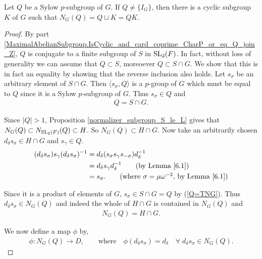 \begin{theorem}
  \label{MaximalAbelianSubgroup.exists_IsCyclic_K_normalizer_eq_Q_join_K}
  Let $Q$ be a Sylow $p$-subgroup of $G$. If $Q \neq \{I_G\}$, then there is a cyclic subgroup $K$ of $G$ such that $N_G(Q) = Q \sqcup K = QK$. \\
\end{theorem}
\begin{proof}
By part \ref{MaximalAbelianSubgroup.IsCyclic_and_card_coprime_CharP_or_eq_Q_join_Z}, $Q$ is conjugate to a finite subgroup of $S$ in $\operatorname{SL}_2(F)$. In fact, without loss of generality we can assume that $Q \subset S$, moreoever $Q \subset S \cap G$. We show that this is in fact an equality by showing that the reverse inclusion also holds. 
Let $s_\sigma$ be an arbitrary element of $S \cap G$. Then $\langle s_\sigma, Q \rangle$ is a $p$-group of $G$ which must be equal to $Q$ since it is a Sylow $p$-subgroup of $G$. Thus $s_\sigma \in Q$ and
\begin{align}\label{Q=TNG} Q = S \cap G.
\end{align}

Since $|Q| > 1$, Proposition \ref{normalizer_subgroup_S_le_L} gives that $N_G(Q) \subset N_{\operatorname{SL}_2(F)}(Q) \subset H$. So $N_G(Q) \subset H \cap G$. Now take an arbitrarily chosen $d_\delta s_\sigma \in H \cap G$ and $s_\gamma \in Q$.
\begin{align*} (d_\delta s_\sigma) s_\gamma (d_\delta s_\sigma)^{-1} &= d_\delta ( s_\sigma s_\gamma  s_{-\sigma}) d^{-1}_\delta
\\ &=  d_\delta s_\gamma d^{-1}_\delta \tag{by Lemma \ref{6.1}}
\\ &= s_\sigma. \tag{where $\sigma = \mu \omega^{-2}$, by Lemma \ref{6.1}}
\end{align*}

Since it is a product of elements of $G$, $s_\sigma \in S \cap G = Q$ by (\ref{Q=TNG}). Thus $d_\delta s_\sigma \in N_G(Q)$ and indeed the whole of $H \cap G$ is contained in $N_G(Q)$ and
\begin{align}\label{normQ=HNG} N_G(Q) = H \cap G.
\end{align}

We now define a map $\phi$ by,
\begin{align*} \phi : N_G(Q) \longrightarrow D, \qquad \text{where} \quad \! \phi(d_\delta s_\sigma) = d_\delta \quad \forall \; d_\delta s_\sigma \in N_G(Q).
\end{align*}


\end{proof}
